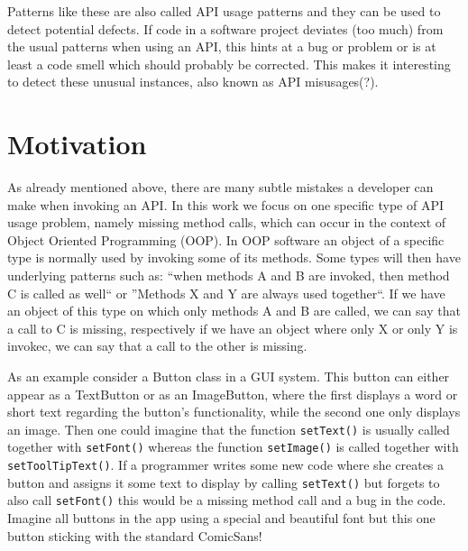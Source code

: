 Patterns like these are also called API usage patterns \cite{robillard2013automated} and they can be used to detect potential defects.
If code in a software project deviates (too much) from the usual patterns when using an API, this hints at a bug or problem or is at least a code smell which should probably be corrected.
This makes it interesting to detect these unusual instances, also known as API misusages(?).

\section{Motivation}

As already mentioned above, there are many subtle mistakes a developer can make when invoking an API.
In this work we focus on one specific type of API usage problem, namely missing method calls, which can occur in the context of Object Oriented Programming (OOP).
In OOP software an object of a specific type is normally used by invoking some of its methods.
Some types will then have underlying patterns such as: ``when methods A and B are invoked, then method C is called as well`` or ''Methods X and Y are always used together``.
If we have an object of this type on which only methods A and B are called, we can say that a call to C is missing, respectively if we have an object where only X or only Y is invokec, we can say that a call to the other is missing.

As an example consider a Button class in a GUI system.
This button can either appear as a TextButton or as an ImageButton, where the first displays a word or short text regarding the button's functionality, while the second one only displays an image.
Then one could imagine that the function \texttt{setText()} is usually called together with \texttt{setFont()} whereas the function \texttt{setImage()} is called together with \texttt{setToolTipText()}.
If a programmer writes some new code where she creates a button and assigns it some text to display by calling \texttt{setText()} but forgets to also call \texttt{setFont()} this would be a missing method call and a bug in the code.
Imagine all buttons in the app using a special and beautiful font but this one button sticking with the standard ComicSans!

